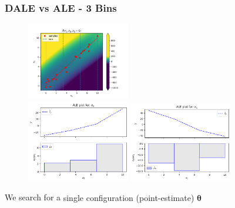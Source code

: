 \documentclass{beamer}
\newcommand{\thetab}{\boldsymbol{\theta}}
\begin{document}
\begin{frame}
  \frametitle{DALE vs ALE - 3 Bins}
  \begin{figure}[ht]
    \centering
    \includegraphics[width=0.4\textwidth]{./figures/bin_splitting_3_bins.png}\\
    \includegraphics[width=0.4\textwidth]{./figures/dale_3_bins.png}
    \includegraphics[width=0.4\textwidth]{./figures/ale_3_bins.png}
    \label{}
  \end{figure}
  \noindent\makebox[\linewidth]{\rule{\paperwidth}{0.4pt}}
  We search for a \alert{single configuration (point-estimate) \( \hat{\thetab}\) }
\end{frame}
\end{document}
